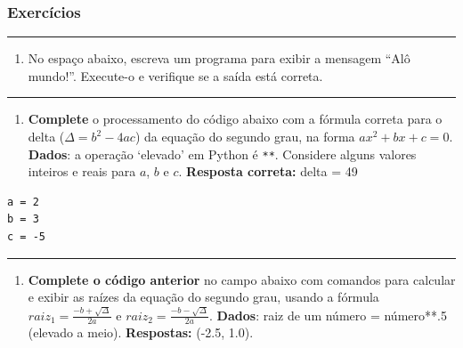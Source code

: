 \documentclass[12pt,a4paper]{article}
\renewcommand{\linethickness}{0.05em}
\providecommand{\tightlist}{%
      \setlength{\itemsep}{0pt}\setlength{\parskip}{0pt}}
\begin{document}
    \hypertarget{exercuxedcios}{%
\subsubsection{Exercícios}\label{exercuxedcios}}

    \begin{center}\rule{0.5\linewidth}{\linethickness}\end{center}

\begin{enumerate}
\def\labelenumi{\arabic{enumi}.}
\tightlist
\item
  No espaço abaixo, escreva um programa para exibir a mensagem ``Alô
  mundo!''. Execute-o e verifique se a saída está correta.
\end{enumerate}

    \begin{center}\rule{0.5\linewidth}{\linethickness}\end{center}

\begin{enumerate}
\def\labelenumi{\arabic{enumi}.}
\setcounter{enumi}{1}
\tightlist
\item
  \textbf{Complete} o processamento do código abaixo com a fórmula
  correta para o delta (\(\Delta = b^2-4ac\)) da equação do segundo
  grau, na forma \(ax^{2}+bx+c=0\). \textbf{Dados}: a operação `elevado'
  em Python é \texttt{**}. Considere alguns valores inteiros e reais
  para \(a\), \(b\) e \(c\). \textbf{Resposta correta:} delta = 49
\end{enumerate}

\begin{verbatim}
a = 2
b = 3
c = -5
\end{verbatim}

    \begin{center}\rule{0.5\linewidth}{\linethickness}\end{center}

\begin{enumerate}
\def\labelenumi{\arabic{enumi}.}
\setcounter{enumi}{2}
\tightlist
\item
  \textbf{Complete o código anterior} no campo abaixo com comandos para
  calcular e exibir as raízes da equação do segundo grau, usando a
  fórmula \(raiz_1=\frac{-b+\sqrt{\Delta}}{2a}\) e
  \(raiz_2=\frac{-b-\sqrt{\Delta}}{2a}\). \textbf{Dados}: raiz de um
  número = número**.5 (elevado a meio). \textbf{Respostas:} (-2.5, 1.0).
\end{enumerate}
\end{document}
